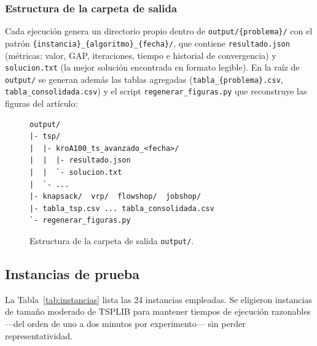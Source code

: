 \subsubsection*{Estructura de la carpeta de salida}

Cada ejecución genera un directorio propio dentro de
\texttt{output/\{problema\}/} con el patrón
\texttt{\{instancia\}\_\{algoritmo\}\_\{fecha\}/}, que contiene
\texttt{resultado.json} (métricas: valor, GAP, iteraciones, tiempo e
historial de convergencia) y \texttt{solucion.txt} (la mejor solución
encontrada en formato legible).
En la raíz de \texttt{output/} se generan además las tablas agregadas
(\texttt{tabla\_\{problema\}.csv}, \texttt{tabla\_consolidada.csv}) y el
script \texttt{regenerar\_figuras.py} que reconstruye las figuras del
artículo:

\begin{figure}[H]
\footnotesize
\begin{verbatim}
output/
|- tsp/
|  |- kroA100_ts_avanzado_<fecha>/
|  |  |- resultado.json
|  |  `- solucion.txt
|  `- ...
|- knapsack/  vrp/  flowshop/  jobshop/
|- tabla_tsp.csv ... tabla_consolidada.csv
`- regenerar_figuras.py
\end{verbatim}
\vspace{-0.5em}
\caption{Estructura de la carpeta de salida \texttt{output/}.}
\label{fig:output_tree}
\end{figure}

\subsection{Instancias de prueba}

La Tabla~\ref{tab:instancias} lista las 24 instancias empleadas.
Se eligieron instancias de tamaño moderado de TSPLIB para mantener tiempos
de ejecución razonables —del orden de uno a dos minutos por experimento—
sin perder representatividad.

